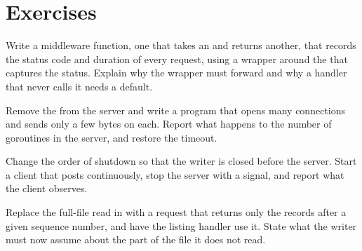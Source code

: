 \section*{Exercises}

\begin{exercise}
Write a middleware function, one that takes an  and returns another, that records the status code and duration of every request, using a wrapper around the  that captures the status. Explain why the wrapper must forward  and why a handler that never calls it needs a default.
\end{exercise}

\begin{exercise}
Remove the  from the server and write a program that opens many connections and sends only a few bytes on each. Report what happens to the number of goroutines in the server, and restore the timeout.
\end{exercise}

\begin{exercise}
Change the order of shutdown so that the writer is closed before the server. Start a client that posts continuously, stop the server with a signal, and report what the client observes.
\end{exercise}

\begin{exercise}
Replace the full-file read in  with a request that returns only the records after a given sequence number, and have the listing handler use it. State what the writer must now assume about the part of the file it does not read.
\end{exercise}
